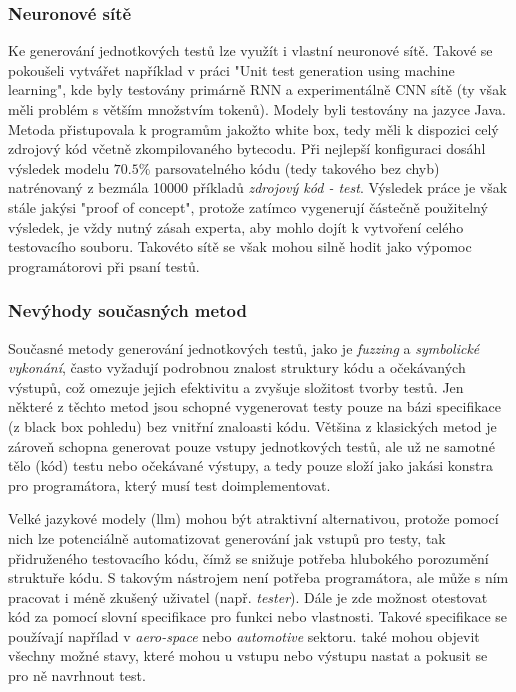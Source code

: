 \documentclass[czech, ma, kiv, he, iso690alph, pdf, viewonly]{fasthesis}
\begin{document}
        \subsubsection{Neuronové sítě}
        Ke generování jednotkových testů lze využít i vlastní neuronové sítě. Takové se pokoušeli vytvářet například v práci "Unit test generation using machine learning"\cite{Saes2018UnitTestGeneration}, kde byly testovány primárně RNN a experimentálně CNN sítě (ty však měli problém s větším množstvím tokenů). Modely byli testovány na jazyce Java. Metoda přistupovala k programům jakožto white box, tedy měli k dispozici celý zdrojový kód včetně zkompilovaného bytecodu. Při nejlepší konfiguraci dosáhl výsledek modelu \(70.5\%\) parsovatelného kódu (tedy takového bez chyb) natrénovaný z bezmála 10000 příkladů \textit{zdrojový kód - test}. Výsledek práce je však stále jakýsi "proof of concept", protože zatímco vygenerují částečně použitelný výsledek, je vždy nutný zásah experta, aby mohlo dojít k vytvoření celého testovacího souboru. Takovéto sítě se však mohou silně hodit jako výpomoc programátorovi při psaní testů.

        \subsubsection{Nevýhody současných metod}
        Současné metody generování jednotkových testů, jako je \textit{fuzzing} a \textit{symbolické vykonání}, často vyžadují podrobnou znalost struktury kódu a očekávaných výstupů, což omezuje jejich efektivitu a zvyšuje složitost tvorby testů. Jen některé z těchto metod jsou schopné vygenerovat testy pouze na bázi specifikace (z black box pohledu) bez vnitřní znaloasti kódu. Většina z klasických metod je zároveň schopna generovat pouze vstupy jednotkových testů, ale už ne samotné tělo (kód) testu nebo očekávané výstupy, a tedy pouze složí jako jakási konstra pro programátora, který musí test doimplementovat.

        Velké jazykové modely (\gls{llm}) mohou být atraktivní alternativou, protože pomocí nich lze potenciálně automatizovat generování jak vstupů pro testy, tak přidruženého testovacího kódu, čímž se snižuje potřeba hlubokého porozumění struktuře kódu. S takovým nástrojem není potřeba programátora, ale může s ním pracovat i méně zkušený uživatel (např. \textit{tester}). Dále je zde možnost otestovat kód za pomocí slovní specifikace pro funkci nebo vlastnosti. Takové specifikace se používají napřílad v \textit{aero-space} nebo \textit{automotive} sektoru.  také mohou objevit všechny možné stavy, které mohou u vstupu nebo výstupu nastat a pokusit se pro ně navrhnout test.
\end{document}
